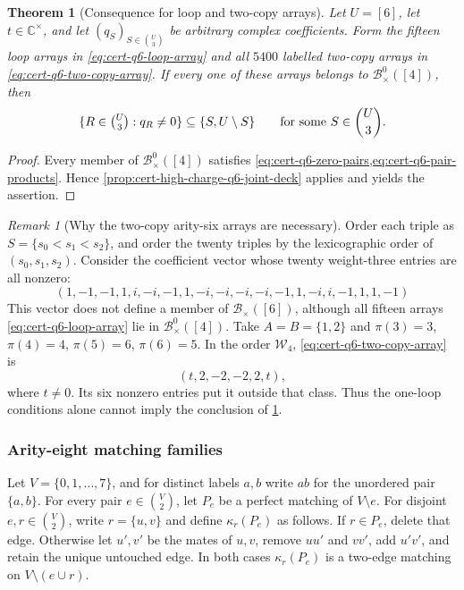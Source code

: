 \documentclass[11pt,letterpaper,onecolumn]{article}
\theoremstyle{plain}
\newtheorem{theorem}{Theorem}[section]
\theoremstyle{definition}
\theoremstyle{remark}
\newtheorem{remark}[remark]{Remark}
\begin{document}
	
	\begin{theorem}[Consequence for loop and two-copy arrays]
		\label{thm:cert-high-charge-q6-interface}
		Let \(U=[6]\), let \(t\in\mathbb C^\times\), and let
		\((q_S)_{S\in\binom U3}\) be arbitrary complex coefficients.  Form the
		fifteen loop arrays in \cref{eq:cert-q6-loop-array} and all \(5400\)
		labelled two-copy arrays in \cref{eq:cert-q6-two-copy-array}.  If every one
		of these arrays belongs to \(\mathcal B_\times^0([4])\), then
		\[
		\{R\in\tbinom U3:q_R\ne0\}
		\subseteq\{S,U\setminus S\}
		\qquad\text{for some }S\in\binom U3.
		\]
	\end{theorem}
	
	\begin{proof}
		Every member of \(\mathcal B_\times^0([4])\) satisfies
		\cref{eq:cert-q6-zero-pairs,eq:cert-q6-pair-products}. Hence
		\cref{prop:cert-high-charge-q6-joint-deck} applies and yields the assertion.
	\end{proof}
	
	\begin{remark}[Why the two-copy arity-six arrays are necessary]
		\label{rem:cert-high-charge-q6-one-loop-insufficient}
		Order each triple as \(S=\{s_0<s_1<s_2\}\), and order the twenty triples by
        the lexicographic order of \((s_0,s_1,s_2)\). Consider the coefficient
        vector whose twenty weight-three entries are all nonzero:
		\[
		(1,-1,-1,1,i,-i,-1,1,-i,-i,-i,-i,-1,1,-i,i,-1,1,1,-1)
		\]
		This vector does not define a member of \(\mathcal B_\times([6])\), although all fifteen
		arrays \cref{eq:cert-q6-loop-array} lie in
        \(\mathcal B_\times^0([4])\). Take \(A=B=\{1,2\}\) and
        \(\pi(3)=3\), \(\pi(4)=4\), \(\pi(5)=6\), \(\pi(6)=5\).
        In the order \(\mathcal W_4\), \cref{eq:cert-q6-two-copy-array} is
		\[
		(t,2,-2,-2,2,t),
		\]
		where \(t\ne0\). Its six nonzero entries put it outside that class.  Thus
		the one-loop conditions alone cannot imply
		the conclusion of \cref{thm:cert-high-charge-q6-interface}.
	\end{remark}
	
	\subsubsection{Arity-eight matching families}
	\label{proofsubsec:cert-q8-matching-atlas}
	
	Let \(V=\{0,1,\ldots,7\}\), and for distinct labels \(a,b\) write
	\(ab\) for the unordered pair \(\{a,b\}\).  For every pair
	\(e\in\binom V2\), let
	\(P_e\) be a perfect matching of \(V\setminus e\).  For disjoint
	\(e,r\in\binom V2\), write \(r=\{u,v\}\) and define \(\kappa_r(P_e)\) as follows.  If
	\(r\in P_e\), delete that edge.  Otherwise let \(u',v'\) be the mates of
	\(u,v\), remove \(uu'\) and \(vv'\), add \(u'v'\), and retain the unique
	untouched edge.  In both cases \(\kappa_r(P_e)\) is a two-edge matching on
	\(V\setminus(e\cup r)\).
	
\end{document}
